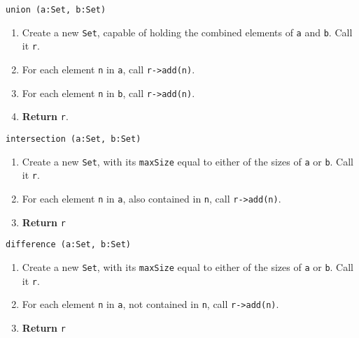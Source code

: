 \vspace{8mm}
\texttt{union (a:Set, b:Set)}
\begin{enumerate}
	\item Create a new \texttt{Set}, capable of holding the combined elements of \texttt{a} and \texttt{b}. Call it \texttt{r}.
	\item For each element \texttt{n} in \texttt{a}, call \texttt{r->add(n)}.
	\item For each element \texttt{n} in \texttt{b}, call \texttt{r->add(n)}.
	\item \textbf{Return} \texttt{r}.
\end{enumerate}
\vspace{5mm}
\texttt{intersection (a:Set, b:Set)}
\begin{enumerate}
	\item Create a new \texttt{Set}, with its \texttt{maxSize} equal to either of the sizes of \texttt{a} or \texttt{b}.
		Call it \texttt{r}.
	\item For each element \texttt{n} in \texttt{a}, also contained in \texttt{n}, call \texttt{r->add(n)}.
	\item \textbf{Return} \texttt{r} 
\end{enumerate}
\vspace{5mm}
\texttt{difference (a:Set, b:Set)}
\begin{enumerate}
	\item Create a new \texttt{Set}, with its \texttt{maxSize} equal to either of the sizes of \texttt{a} or \texttt{b}.
		Call it \texttt{r}.
	\item For each element \texttt{n} in \texttt{a}, not contained in \texttt{n}, call \texttt{r->add(n)}.
	\item \textbf{Return} \texttt{r} 
\end{enumerate}

\sourcecode



